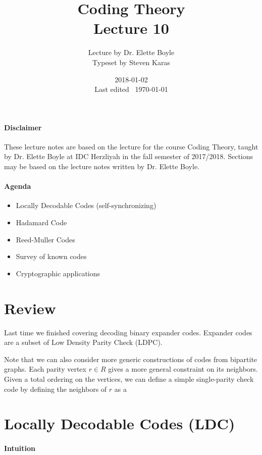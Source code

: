 \documentclass{idc_msc}
\title{Coding Theory\\\large Lecture 10}
\date{2018-01-02 \\ Last edited \currenttime\ \today}
\author{Lecture by Dr. Elette Boyle\\Typeset by Steven Karas}
\begin{document}
\maketitle

\paragraph{Disclaimer}

These lecture notes are based on the lecture for the course Coding Theory, taught by Dr. Elette Boyle at IDC Herzliyah in the fall semester of 2017/2018.
Sections may be based on the lecture notes written by Dr. Elette Boyle.

\paragraph{Agenda}

\begin{itemize}
  \item Locally Decodable Codes (self-synchronizing)
  \item Hadamard Code
  \item Reed-Muller Codes
  \item Survey of known codes
  \item Cryptographic applications
\end{itemize}

\section{Review}

Last time we finished covering decoding binary expander codes.
Expander codes are a subset of Low Density Parity Check (LDPC).

Note that we can also consider more generic constructions of codes from bipartite graphs.
Each parity vertex \(r \in R\) gives a more general constraint on its neighbors.
Given a total ordering on the vertices, we can define a simple single-parity check code by defining the neighbors of \(r\) as a 

\section{Locally Decodable Codes (LDC)}

\paragraph{Intuition}
\end{document}
